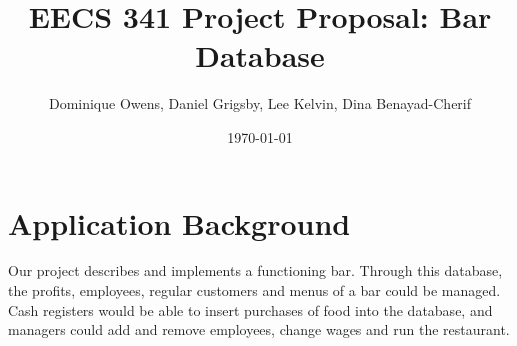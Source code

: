 \documentclass[dvips,12pt]{article}
\begin{document}
\vspace{-4in}

\title{EECS 341 Project Proposal: Bar Database}
\author{Dominique Owens, Daniel Grigsby, Lee Kelvin, Dina Benayad-Cherif}
\date{\today}



\maketitle


\section{Application Background}


Our project describes and implements a functioning bar. Through this database, the profits, employees, regular customers and menus of a bar could be managed. Cash registers would be able to insert purchases of food into the database, and managers could add and remove employees, change wages and run the restaurant. 
\end{document}
